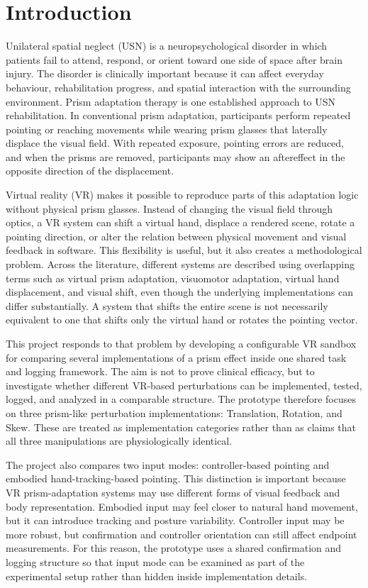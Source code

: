 \chapter{Introduction}
\label{chap:Intro}

Unilateral spatial neglect (USN) is a neuropsychological disorder in which patients fail to attend, respond, or orient toward one side of space after brain injury. The disorder is clinically important because it can affect everyday behaviour, rehabilitation progress, and spatial interaction with the surrounding environment. Prism adaptation therapy is one established approach to USN rehabilitation. In conventional prism adaptation, participants perform repeated pointing or reaching movements while wearing prism glasses that laterally displace the visual field. With repeated exposure, pointing errors are reduced, and when the prisms are removed, participants may show an aftereffect in the opposite direction of the displacement.

Virtual reality (VR) makes it possible to reproduce parts of this adaptation logic without physical prism glasses. Instead of changing the visual field through optics, a VR system can shift a virtual hand, displace a rendered scene, rotate a pointing direction, or alter the relation between physical movement and visual feedback in software. This flexibility is useful, but it also creates a methodological problem. Across the literature, different systems are described using overlapping terms such as virtual prism adaptation, visuomotor adaptation, virtual hand displacement, and visual shift, even though the underlying implementations can differ substantially. A system that shifts the entire scene is not necessarily equivalent to one that shifts only the virtual hand or rotates the pointing vector.

This project responds to that problem by developing a configurable VR sandbox for comparing several implementations of a prism effect inside one shared task and logging framework. The aim is not to prove clinical efficacy, but to investigate whether different VR-based perturbations can be implemented, tested, logged, and analyzed in a comparable structure. The prototype therefore focuses on three prism-like perturbation implementations: Translation, Rotation, and Skew. These are treated as implementation categories rather than as claims that all three manipulations are physiologically identical.

The project also compares two input modes: controller-based pointing and embodied hand-tracking-based pointing. This distinction is important because VR prism-adaptation systems may use different forms of visual feedback and body representation. Embodied input may feel closer to natural hand movement, but it can introduce tracking and posture variability. Controller input may be more robust, but confirmation and controller orientation can still affect endpoint measurements. For this reason, the prototype uses a shared confirmation and logging structure so that input mode can be examined as part of the experimental setup rather than hidden inside implementation details.

